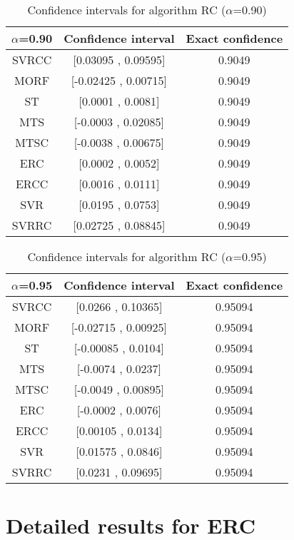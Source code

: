 \documentclass[a4paper,10pt]{article}
\begin{document}
\begin{table}[!htp]
\centering\small
\begin{tabular}{
|c|c|c|}
\hline
 $\alpha$=0.90 & Confidence interval & Exact confidence \\ \hline 
SVRCC & [0.03095 , 0.09595] & 0.9049\\ \hline 
MORF & [-0.02425 , 0.00715] & 0.9049\\ \hline 
ST & [0.0001 , 0.0081] & 0.9049\\ \hline 
MTS & [-0.0003 , 0.02085] & 0.9049\\ \hline 
MTSC & [-0.0038 , 0.00675] & 0.9049\\ \hline 
ERC & [0.0002 , 0.0052] & 0.9049\\ \hline 
ERCC & [0.0016 , 0.0111] & 0.9049\\ \hline 
SVR & [0.0195 , 0.0753] & 0.9049\\ \hline 
SVRRC & [0.02725 , 0.08845] & 0.9049\\ \hline 

\end{tabular}
\caption{Confidence intervals for algorithm RC ($\alpha$=0.90)}
\end{table}
\begin{table}[!htp]
\centering\small
\begin{tabular}{
|c|c|c|}
\hline
 $\alpha$=0.95 & Confidence interval & Exact confidence \\ \hline 
SVRCC & [0.0266 , 0.10365] & 0.95094\\ \hline 
MORF & [-0.02715 , 0.00925] & 0.95094\\ \hline 
ST & [-0.00085 , 0.0104] & 0.95094\\ \hline 
MTS & [-0.0074 , 0.0237] & 0.95094\\ \hline 
MTSC & [-0.0049 , 0.00895] & 0.95094\\ \hline 
ERC & [-0.0002 , 0.0076] & 0.95094\\ \hline 
ERCC & [0.00105 , 0.0134] & 0.95094\\ \hline 
SVR & [0.01575 , 0.0846] & 0.95094\\ \hline 
SVRRC & [0.0231 , 0.09695] & 0.95094\\ \hline 

\end{tabular}
\caption{Confidence intervals for algorithm RC ($\alpha$=0.95)}
\end{table}

 \clearpage 


\section{Detailed results for ERC}
\end{document}

